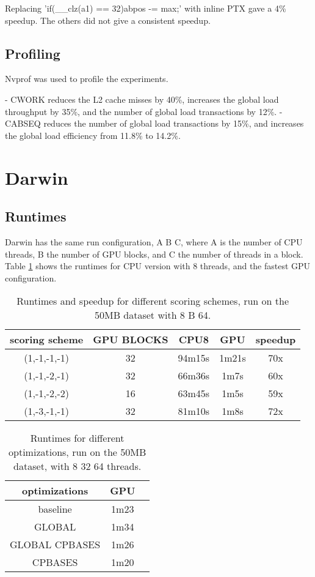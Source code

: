 \documentclass[../main/thesis.tex]{subfiles}
\begin{document}
Replacing 'if(\_\_clz(a1) == 32){abpos -= max;}' with inline PTX gave a 4\% speedup.
The others did not give a consistent speedup.



\subsection{Profiling}
Nvprof \cite{nvprof} was used to profile the experiments.

- CWORK reduces the L2 cache misses by 40\%, increases the global load throughput by 35\%, and the number of global load transactions by 12\%.
- CABSEQ reduces the number of global load transactions by 15\%, and increases the global load efficiency from 11.8\% to 14.2\%.


\section{Darwin}
\subsection{Runtimes}
Darwin has the same run configuration, A B C, where A is the number of CPU threads, B the number of GPU blocks, and C the number of threads in a block.
Table \ref{tbl:darwin1} shows the runtimes for CPU version with 8 threads, and the fastest GPU configuration.

\begin{table}
\centering
\caption{Runtimes and speedup for different scoring schemes, run on the 50MB dataset with 8 B 64.}
\label{tbl:darwin1}
\begin{tabular}{c c c c c}
scoring scheme & GPU BLOCKS & CPU8 & GPU & speedup \\ \hline
(1,-1,-1,-1) & 32 & 94m15s & 1m21s & 70x \\
(1,-1,-2,-1) & 32 & 66m36s & 1m7s  & 60x \\
(1,-1,-2,-2) & 16 & 63m45s & 1m5s  & 59x \\
(1,-3,-1,-1) & 32 & 81m10s & 1m8s  & 72x \\
\end{tabular}
\end{table}




\begin{table}
\centering
\caption{Runtimes for different optimizations, run on the 50MB dataset, with 8 32 64 threads.}
\label{tbl:darwin2}
\begin{tabular}{c c c}
optimizations & GPU \\ \hline
baseline & 1m23 \\
GLOBAL & 1m34 \\
GLOBAL CPBASES & 1m26 \\
CPBASES & 1m20 \\
\end{tabular}
\end{table}
\end{document}
